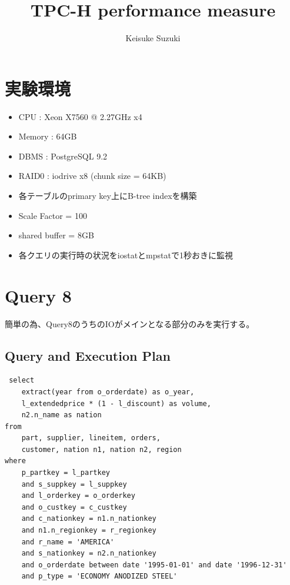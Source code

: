 \documentclass[11pt,a4paper]{jsarticle}
\title{TPC-H performance measure}
\author{Keisuke Suzuki}
\begin{document}
\maketitle
\section{実験環境}
\begin{itemize}
 \item CPU : Xeon X7560 @ 2.27GHz x4
 \item Memory : 64GB
 \item DBMS : PostgreSQL 9.2
 \item RAID0 : iodrive x8 (chunk size = 64KB)
 \item 各テーブルのprimary key上にB-tree indexを構築
 \item Scale Factor = 100
 \item shared buffer = 8GB
 \item 各クエリの実行時の状況をiostatとmpstatで1秒おきに監視
\end{itemize}

\clearpage
\section{Query 8}
簡単の為、Query8のうちのIOがメインとなる部分のみを実行する。

\subsection{Query and Execution Plan}
\begin{verbatim}
 select
	extract(year from o_orderdate) as o_year,
	l_extendedprice * (1 - l_discount) as volume,
	n2.n_name as nation
from
	part, supplier, lineitem, orders,
	customer, nation n1, nation n2,	region
where
	p_partkey = l_partkey
	and s_suppkey = l_suppkey
	and l_orderkey = o_orderkey
	and o_custkey = c_custkey
	and c_nationkey = n1.n_nationkey
	and n1.n_regionkey = r_regionkey
	and r_name = 'AMERICA'
	and s_nationkey = n2.n_nationkey
	and o_orderdate between date '1995-01-01' and date '1996-12-31'
	and p_type = 'ECONOMY ANODIZED STEEL'
\end{verbatim}
\end{document}
